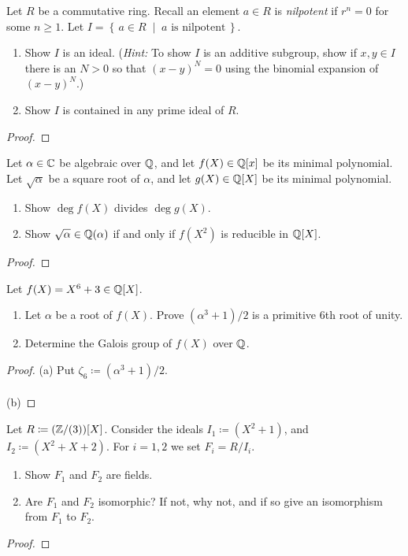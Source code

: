 \begin{problem}
Let $R$ be a commutative ring. Recall an element $a\in R$ is
\emph{nilpotent} if $r^n=0$ for some $n\geq 1$. Let $I=\left\{\,a\in
  R\;\middle|\;\text{$a$ is nilpotent}\,\right\}$.
\begin{enumerate}[label=(\alph*)]
\item Show $I$ is an ideal. (\emph{Hint:} To show $I$ is an additive
  subgroup, show if $x,y\in I$ there is an $N>0$ so that $(x-y)^N=0$ using
  the binomial expansion of $(x-y)^N$.)
\item Show $I$ is contained in any prime ideal of $R$.
\end{enumerate}
\end{problem}
\begin{proof}
\end{proof}

\begin{problem}
Let $\alpha\in\mathbb{C}$ be algebraic over $\mathbb{Q}$, and let $f(X)\in\mathbb{Q}[x]$ be
its minimal polynomial. Let $\sqrt{\alpha}$ be a square root of $\alpha$,
and let $g(X)\in\mathbb{Q}[X]$ be its minimal polynomial.
\begin{enumerate}[label=(\alph*)]
\item Show $\deg f(X)$ divides $\deg g(X)$.
\item Show $\sqrt{\alpha}\in\mathbb{Q}(\alpha)$ if and only if $f(X^2)$ is
  reducible in $\mathbb{Q}[X]$.
\end{enumerate}
\end{problem}
\begin{proof}
\end{proof}

\begin{problem}
Let $f(X)=X^6+3\in\mathbb{Q}[X]$.
\begin{enumerate}[label=(\alph*)]
\item Let $\alpha$ be a root of $f(X)$. Prove $(\alpha^3+1)/2$ is a
  primitive 6th root of unity.
\item Determine the Galois group of $f(X)$ over $\mathbb{Q}$.
\end{enumerate}
\end{problem}
\begin{proof}
(a) Put $\zeta_6\coloneqq(\alpha^3+1)/2$.
\\\\
(b)
\end{proof}

\begin{problem}
Let $R\coloneqq(\mathbb{Z}/(3))[X]$. Consider the ideals $I_1\coloneqq(X^2+1)$,
and $I_2\coloneqq(X^2+X+2)$. For $i=1,2$ we set $F_i=R/I_i$.
\begin{enumerate}[label=(\alph*)]
\item Show $F_1$ and $F_2$ are fields.
\item Are $F_1$ and $F_2$ isomorphic? If not, why not, and if so give an
  isomorphism from $F_1$ to $F_2$.
\end{enumerate}
\end{problem}
\begin{proof}
\end{proof}

